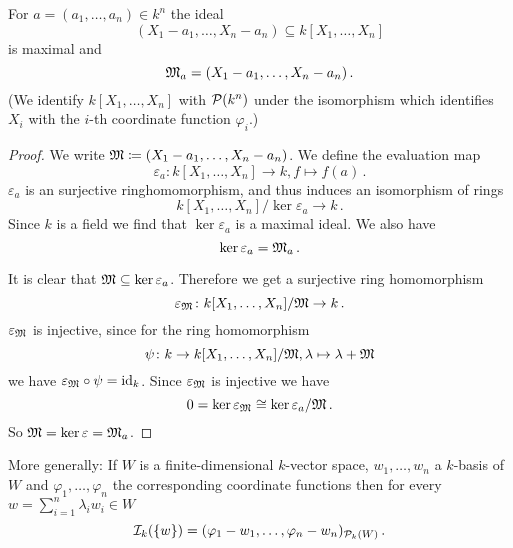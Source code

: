 \begin{lem}
  For $a = (a_1, \dotsc, a_n) \in k^n$ the ideal
  \[
              (X_1 - a_1, \dotsc, X_n - a_n)
    \subseteq k[X_1, \dotsc, X_n]
  \]
  is maximal and
  \[
    \mathfrak{M}_a = (X_1 - a_1, \dotsc, X_n - a_n) \,.
  \]
  (We identify $k[X_1, \dotsc, X_n]$ with $\mathcal{P}(k^n)$ under the isomorphism which identifies $X_i$ with the $i$-th coordinate function $\varphi_i$.)
\end{lem}
\begin{proof}
  We write $\mathfrak{M} \coloneqq (X_1 - a_1, \dotsc, X_n - a_n)$. We define the evaluation map
  \[
            \varepsilon_a
    \colon  k[X_1, \dotsc, X_n]
    \to     k,
            f
    \mapsto f(a) \,.
  \]
  $\varepsilon_a$ is an surjective ringhomomorphism, and thus induces an isomorphism of rings
  \[
        k[X_1, \dotsc, X_n] / \ker \varepsilon_a
    \to k \,.
  \]
  Since $k$ is a field we find that $\ker \varepsilon_a$ is a maximal ideal. We also have
  \[
      \ker \varepsilon_a
    = \mathfrak{M}_a \,.
  \]
  
  It is clear that $\mathfrak{M} \subseteq \ker \varepsilon_a$. Therefore we get a surjective ring homomorphism
  \[
            \varepsilon_\mathfrak{M}
    \colon  k[X_1, \dotsc, X_n] / \mathfrak{M}
    \to     k \,.
  \]
  $\varepsilon_\mathfrak{M}$ is injective, since for the ring homomorphism
  \[
            \psi
    \colon  k
    \to     k[X_1, \dotsc, X_n] / \mathfrak{M},
            \lambda
    \mapsto \lambda + \mathfrak{M}
  \]
  we have $\varepsilon_\mathfrak{M} \circ \psi = \operatorname{id}_k$. Since $\varepsilon_\mathfrak{M}$ is injective we have
  \[
          0
    =     \ker \varepsilon_\mathfrak{M}
    \cong \ker \varepsilon_a / \mathfrak{M} \,.
  \]
  So $\mathfrak{M} = \ker \varepsilon = \mathfrak{M}_a$.
\end{proof}

More generally:
If $W$ is a finite-dimensional $k$-vector space, $w_1, \dotsc, w_n$ a $k$-basis of $W$ and $\varphi_1, \dotsc, \varphi_n$ the corresponding coordinate functions then for every $w = \sum_{i=1}^n \lambda_i w_i \in W$
\[
    \mathcal{I}_k(\{w\})
  = ( \varphi_1 - w_1, \dotsc, \varphi_n - w_n )_{\mathcal{P}_k(W)} \,.
\]


